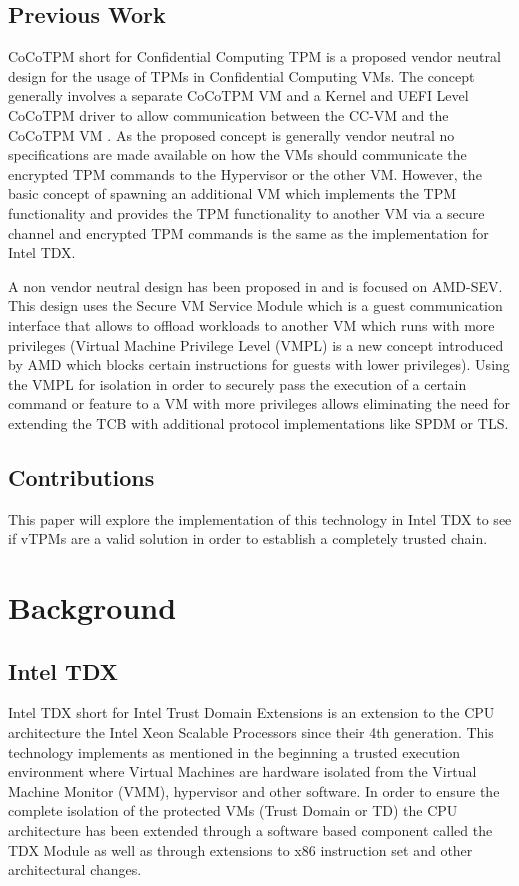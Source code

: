 \documentclass[sigplan,screen,nonacm]{acmart}
\begin{document}
\subsection{Previous Work}
CoCoTPM short for Confidential Computing TPM is a proposed vendor neutral design for the usage of TPMs in Confidential Computing VMs.
The concept generally involves a separate CoCoTPM VM and a Kernel and UEFI Level CoCoTPM driver to allow communication between the CC-VM and the CoCoTPM VM \cite[3]{10.1145/3564625.3564648}.
As the proposed concept is generally vendor neutral no specifications are made available on how the VMs should communicate the encrypted TPM commands to the Hypervisor or the other VM.
However, the basic concept of spawning an additional VM which implements the TPM functionality and provides the TPM functionality to another VM via a secure channel and encrypted TPM commands is the same as the implementation for Intel TDX.

A non vendor neutral design has been proposed in \cite{10.1145/3627106.3627112} and is focused on AMD-SEV.
This design uses the Secure VM Service Module which is a guest communication interface that allows to offload workloads to another VM which runs with more privileges (Virtual Machine Privilege Level (VMPL) is a new concept introduced by AMD which blocks certain instructions for guests with lower privileges).
Using the VMPL for isolation in order to securely pass the execution of a certain command or feature to a VM with more privileges allows eliminating the need for extending the TCB with additional protocol implementations like SPDM or TLS.

\subsection{Contributions}

This paper will explore the implementation of this technology in Intel TDX to see if vTPMs are a valid solution in order to establish a completely trusted chain.

\section{Background}

\subsection{Intel TDX}
Intel TDX short for Intel Trust Domain Extensions is an extension to the CPU architecture the Intel Xeon Scalable Processors since their 4th generation\cite{Intel-TDX-support}.
This technology implements as mentioned in the beginning a trusted execution environment where Virtual Machines are hardware isolated from the Virtual Machine Monitor (VMM), hypervisor and other software.
In order to ensure the complete isolation of the protected VMs (Trust Domain or TD) the CPU architecture has been extended through a software based component called the TDX Module as well as through extensions to x86 instruction set and other architectural changes.
\end{document}

